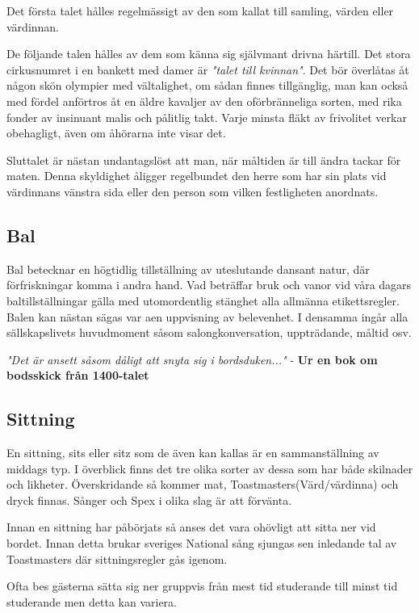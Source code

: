 Det första talet hålles regelmässigt av den som kallat till samling, värden eller värdinnan.

De följande talen hålles av dem som känna sig självmant drivna härtill. Det stora cirkusnumret i en bankett med damer är \textit{"talet till kvinnan"}. Det bör överlåtas åt någon skön olympier med vältalighet, om sådan finnes tillgänglig, man kan också med fördel anförtros åt en äldre kavaljer av den oförbränneliga sorten, med rika fonder av insinuant malis och pålitlig takt. Varje minsta fläkt av frivolitet verkar obehagligt, även om åhörarna inte visar det.

Sluttalet är nästan undantagslöst att man, när måltiden är till ändra tackar för maten. Denna skyldighet åligger regelbundet den herre som har sin plats vid värdinnans vänstra sida eller den person som vilken festligheten anordnats.

\subsection{Bal}
Bal betecknar en högtidlig tillställning av uteslutande dansant natur, där förfriskningar komma i andra hand. Vad beträffar bruk och vanor vid våra dagars baltillställningar gälla med utomordentlig stänghet alla allmänna etikettsregler. Balen kan nästan sägas var aen uppvisning av belevenhet. I densamma ingår alla sällskapslivets huvudmoment såsom salongkonversation, uppträdande, måltid osv.

\textit{"Det är ansett såsom dåligt att snyta sig i bordsduken..."} - \textbf{Ur en bok om bodsskick från 1400-talet}

\subsection{Sittning}

En sittning, sits eller sitz som de även kan kallas är en sammanställning av middags typ. I överblick finns det tre olika sorter av dessa som har både skilnader och likheter. Överskridande så kommer mat, Toastmasters(Värd/värdinna) och dryck finnas. Sånger och Spex i olika slag är att förvänta.

Innan en sittning har påbörjats så anses det vara ohövligt att sitta ner vid bordet. Innan detta brukar sveriges National sång sjungas sen inledande tal av Toastmasters där sittningsregler gås igenom. 

Ofta bes gästerna sätta sig ner gruppvis från mest tid studerande till minst tid studerande men detta kan variera.

